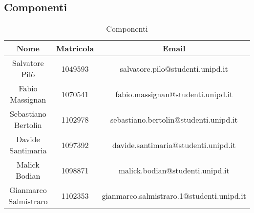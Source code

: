 	\subsection{Componenti}
	\begin{table}[H]
		\centering
		\begin{tabular}{|c|c|c|}
			\hline
			\textbf{Nome}		& \textbf{Matricola}	& \textbf{Email} \\
			\hline
			Salvatore Pilò			& 1049593 			& salvatore.pilo@studenti.unipd.it \\
			Fabio Massignan			& 1070541			& fabio.massignan@studenti.unipd.it\\
			Sebastiano Bertolin		& 1102978			& sebastiano.bertolin@studenti.unipd.it \\
			Davide Santimaria		& 1097392			& davide.santimaria@studenti.unipd.it \\
			Malick Bodian			& 1098871			& malick.bodian@studenti.unipd.it \\
			Gianmarco Salmistraro	& 1102353			& gianmarco.salmistraro.1@studenti.unipd.it \\
			\hline
		\end{tabular}
		\caption{Componenti}
	\end{table}